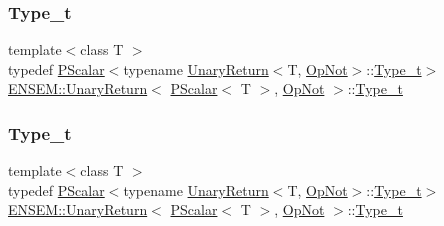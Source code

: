 \subsubsection{\texorpdfstring{Type\_t}{Type\_t}\hspace{0.1cm}{\footnotesize\ttfamily [1/3]}}
{\footnotesize\ttfamily template$<$class T $>$ \\
typedef \mbox{\hyperlink{classENSEM_1_1PScalar}{P\+Scalar}}$<$typename \mbox{\hyperlink{structENSEM_1_1UnaryReturn}{Unary\+Return}}$<$T, \mbox{\hyperlink{structENSEM_1_1OpNot}{Op\+Not}}$>$\+::\mbox{\hyperlink{structENSEM_1_1UnaryReturn_3_01PScalar_3_01T_01_4_00_01OpNot_01_4_a7612702a79b74f223457b785dbd77b2b}{Type\+\_\+t}}$>$ \mbox{\hyperlink{structENSEM_1_1UnaryReturn}{E\+N\+S\+E\+M\+::\+Unary\+Return}}$<$ \mbox{\hyperlink{classENSEM_1_1PScalar}{P\+Scalar}}$<$ T $>$, \mbox{\hyperlink{structENSEM_1_1OpNot}{Op\+Not}} $>$\+::\mbox{\hyperlink{structENSEM_1_1UnaryReturn_3_01PScalar_3_01T_01_4_00_01OpNot_01_4_a7612702a79b74f223457b785dbd77b2b}{Type\+\_\+t}}}

\mbox{\label{structENSEM_1_1UnaryReturn_3_01PScalar_3_01T_01_4_00_01OpNot_01_4_a7612702a79b74f223457b785dbd77b2b}} 
\subsubsection{\texorpdfstring{Type\_t}{Type\_t}\hspace{0.1cm}{\footnotesize\ttfamily [2/3]}}
{\footnotesize\ttfamily template$<$class T $>$ \\
typedef \mbox{\hyperlink{classENSEM_1_1PScalar}{P\+Scalar}}$<$typename \mbox{\hyperlink{structENSEM_1_1UnaryReturn}{Unary\+Return}}$<$T, \mbox{\hyperlink{structENSEM_1_1OpNot}{Op\+Not}}$>$\+::\mbox{\hyperlink{structENSEM_1_1UnaryReturn_3_01PScalar_3_01T_01_4_00_01OpNot_01_4_a7612702a79b74f223457b785dbd77b2b}{Type\+\_\+t}}$>$ \mbox{\hyperlink{structENSEM_1_1UnaryReturn}{E\+N\+S\+E\+M\+::\+Unary\+Return}}$<$ \mbox{\hyperlink{classENSEM_1_1PScalar}{P\+Scalar}}$<$ T $>$, \mbox{\hyperlink{structENSEM_1_1OpNot}{Op\+Not}} $>$\+::\mbox{\hyperlink{structENSEM_1_1UnaryReturn_3_01PScalar_3_01T_01_4_00_01OpNot_01_4_a7612702a79b74f223457b785dbd77b2b}{Type\+\_\+t}}}

